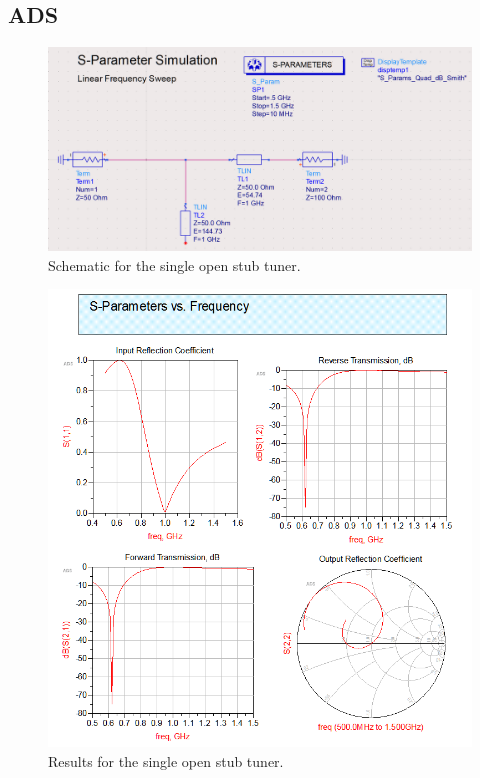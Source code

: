 


\subsection{ADS}
\begin{figure}[H]
    \centering
    \includegraphics[width=0.8\linewidth]{res/ADS/SingleOpenStubSchematic.png}
    \caption{Schematic for the single open stub tuner.}
    \label{fig:}
\end{figure}
\begin{figure}[H]
    \centering
    \includegraphics[width=0.8\linewidth]{res/ADS/SingleOpenStub.png}
    \caption{Results for the single open stub tuner.}
    \label{fig:}
\end{figure}

